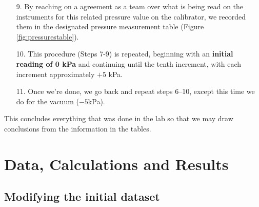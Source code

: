 \documentclass{article}
\newcounter{dataset}
\begin{document}
	\begin{minipage}{0.51\textwidth}\vspace{-2em}\raggedright
		\begin{enumerate}[left=0in]
			\item[9.]  By reaching on a agreement as a team over what is being read on the instruments for this related pressure value on the calibrator, we recorded them in the designated pressure measurement table (Figure \ref{fig:pressurestable}). 
			\item[10.] This procedure (Steps 7-9) is repeated, beginning with an \textbf{initial reading of 0 kPa} and continuing until the tenth increment, with each increment approximately $+5$ kPa.
			\item[11.] Once we're done, we go back and repeat steps 6–10, except this time we do for the vacuum ($-5$kPa).
		\end{enumerate}\noindent
		This concludes everything that was done in the lab so that we may draw conclusions from the information in the tables.
	\end{minipage}
	

	\newpage{}
	\section{Data, Calculations and Results}
	\tikzexternaldisable
	\subsection{Modifying the initial dataset}
\end{document}
